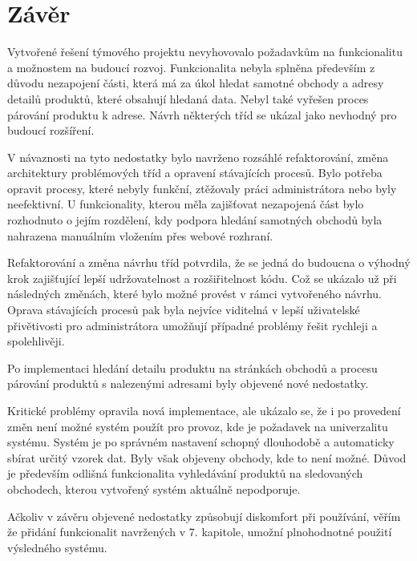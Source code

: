\documentclass[thesis=B,czech]{FITthesis}[2012/06/26]
\begin{document}
\chapter{Závěr}
Vytvořené řešení týmového projektu nevyhovovalo požadavkům na funkcionalitu a možnostem na budoucí rozvoj.
Funkcionalita nebyla splněna především z důvodu nezapojení části, která má za úkol hledat samotné obchody a adresy detailů produktů, které obsahují
hledaná data. Nebyl také vyřešen proces párování produktu k adrese. Návrh některých tříd se ukázal jako nevhodný pro budoucí rozšíření.
\par
V návaznosti na tyto nedostatky bylo navrženo rozsáhlé refaktorování, změna architektury problémových tříd a opravení stávajících
procesů. Bylo potřeba opravit procesy, které nebyly funkční, ztěžovaly práci administrátora nebo byly neefektivní. U funkcionality, kterou měla zajišťovat nezapojená část bylo rozhodnuto o jejím rozdělení, kdy
podpora hledání samotných obchodů byla nahrazena manuálním vložením přes webové rozhraní.
\par
Refaktorování a změna návrhu tříd potvrdila, že se jedná do budoucna o výhodný krok zajišťující lepší udržovatelnost a rozšiřitelnost kódu. Což se ukázalo už při následných změnách, které bylo možné provést v rámci vytvořeného návrhu.
Oprava stávajících procesů pak byla nejvíce viditelná v lepší uživatelské přivětivosti pro administrátora umožňují
případné problémy řešit rychleji a spolehlivěji.
\par
Po implementaci hledání detailu produktu na stránkách obchodů a procesu párování produktů s nalezenými adresami byly
objevené nové nedostatky.
\par
Kritické problémy opravila nová implementace, ale ukázalo se, že i po provedení změn není možné systém použít pro provoz, kde
je požadavek na univerzalitu systému. Systém je po správném nastavení schopný dlouhodobě a automaticky sbírat určitý vzorek dat. Byly však objeveny obchody, kde to není možné. Důvod je především odlišná funkcionalita vyhledávání produktů na sledovaných obchodech, kterou vytvořený systém aktuálně nepodporuje.
\par
Ačkoliv v závěru objevené nedostatky způsobují diskomfort při používání, věřím že přidání funkcionalit navržených v 7. kapitole, umožní plnohodnotné použití výsledného systému.







\appendix
\end{document}
